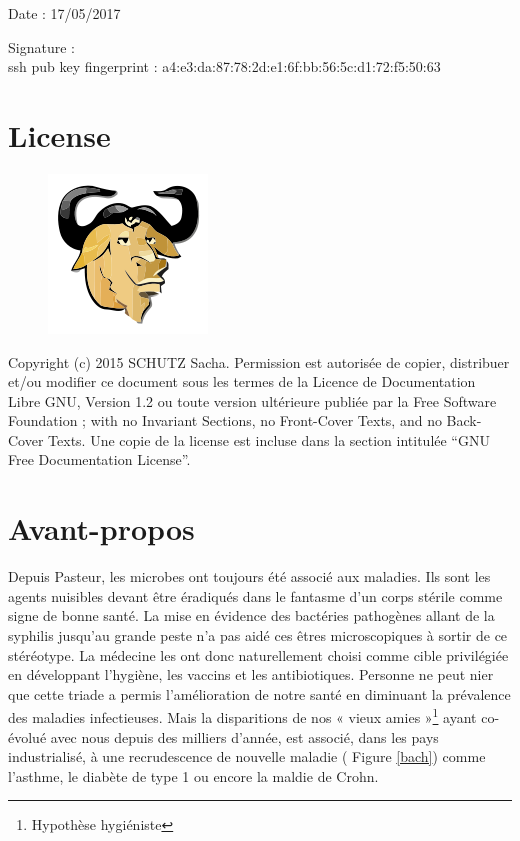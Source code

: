 \documentclass[12pt,a4paper]{article}
\begin{document}
Date : 17/05/2017

\vspace{0.5cm}

Signature : \\

ssh pub key fingerprint : a4:e3:da:87:78:2d:e1:6f:bb:56:5c:d1:72:f5:50:63
\vfill 

\section*{License}

\begin{figure}
\includegraphics[scale=0.5]{img/gfdl.png}\hfill
\end{figure}

Copyright (c) 2015 SCHUTZ Sacha. Permission est autorisée de copier,
distribuer et/ou modifier ce document sous les termes de la Licence de
Documentation Libre GNU, Version 1.2 ou toute version ultérieure publiée
par la Free Software Foundation ; with no Invariant Sections, no
Front-Cover Texts, and no Back-Cover Texts. Une copie de la license est
incluse dans la section intitulée ``GNU Free Documentation License''.

\thispagestyle{empty} 
\setcounter{page}{0}
\thispagestyle{empty} 

\newpage

\tableofcontents
\newpage


\section{Avant-propos}

Depuis Pasteur, les microbes ont toujours été associé aux maladies. Ils sont les agents nuisibles devant être éradiqués dans le fantasme d'un corps stérile comme signe de bonne santé.
La mise en évidence des bactéries pathogènes allant de la syphilis jusqu'au grande peste n'a pas aidé ces êtres microscopiques à sortir de ce stéréotype. La médecine les ont donc naturellement choisi comme cible privilégiée en développant l'hygiène, les vaccins et les antibiotiques.
Personne ne peut nier que cette triade a permis l'amélioration de notre santé en diminuant la prévalence des maladies infectieuses. Mais la disparitions de nos « vieux amies »\footnote{Hypothèse hygiéniste} ayant co-évolué avec nous depuis des milliers d'année, est associé, dans les pays industrialisé, à une recrudescence de nouvelle maladie ( Figure \ref{bach}) comme l'asthme, le diabète de type 1 ou encore la maldie de Crohn.
\end{document}
